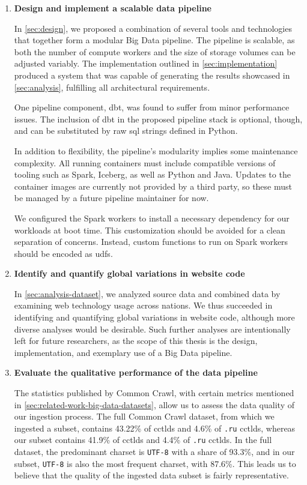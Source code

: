 \begin{enumerate}
    \item \textbf{Design and implement a scalable data pipeline}

    In \cref{sec:design}, we proposed a combination of several tools and technologies that together form a modular Big Data pipeline.
    The pipeline is scalable, as both the number of compute workers and the size of storage volumes can be adjusted variably.
    The implementation outlined in \cref{sec:implementation} produced a system that was capable of generating the results showcased in \cref{sec:analysis}, fulfilling all architectural requirements.

    One pipeline component, dbt, was found to suffer from minor performance issues.
    The inclusion of dbt in the proposed pipeline stack is optional, though, and can be substituted by raw \ac{sql} strings defined in Python.

    In addition to flexibility, the pipeline's modularity implies some maintenance complexity.
    All running containers must include compatible versions of tooling such as Spark, Iceberg, as well as Python and Java.
    Updates to the container images are currently not provided by a third party, so these must be managed by a future pipeline maintainer for now.

    We configured the Spark workers to install a necessary dependency for our workloads at boot time.
    This customization should be avoided for a clean separation of concerns.
    Instead, custom functions to run on Spark workers should be encoded as \acp{udf}.

    \item \textbf{Identify and quantify global variations in website code}

    In \cref{sec:analysis-dataset}, we analyzed source data and combined data by examining web technology usage across nations.
    We thus succeeded in identifying and quantifying global variations in website code, although more diverse analyses would be desirable.
    Such further analyses are intentionally left for future researchers, as the scope of this thesis is the design, implementation, and exemplary use of a Big Data pipeline.

    \item \textbf{Evaluate the qualitative performance of the data pipeline}

    The statistics published by Common Crawl, with certain metrics mentioned in \cref{sec:related-work-big-data-datasets}, allow us to assess the data quality of our ingestion process.
    The full Common Crawl dataset, from which we ingested a subset, contains 43.22\% of \acp{cctld} and 4.6\% of \texttt{.ru} \acp{cctld}, whereas our subset contains 41.9\% of \acp{cctld} and 4.4\% of \texttt{.ru} \acp{cctld}.
    In the full dataset, the predominant charset is \texttt{UTF-8} with a share of 93.3\%, and in our subset, \texttt{UTF-8} is also the most frequent charset, with 87.6\%.
    This leads us to believe that the quality of the ingested data subset is fairly representative.


\end{enumerate}
